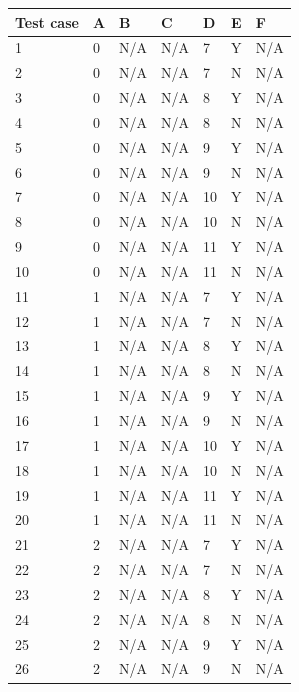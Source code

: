 \documentclass[12pt, letterpaper, titlepage]{article}
\begin{document}
\begin{centering}
\begin{tabularx}{\textwidth}{|X|X|X|X|X|X|X|}
    \caption{Test cases for output X} \\ \hline
    \textbf{Test case} & \textbf{A} & \textbf{B} & \textbf{C} & \textbf{D} & \textbf{E} & \textbf{F} \\ \hline
    1 & 0 & N/A & N/A & 7 & Y & N/A \\ \hline
    2 & 0 & N/A & N/A & 7 & N & N/A \\ \hline
    3 & 0 & N/A & N/A & 8 & Y & N/A \\ \hline
    4 & 0 & N/A & N/A & 8 & N & N/A \\ \hline
    5 & 0 & N/A & N/A & 9 & Y & N/A \\ \hline
    6 & 0 & N/A & N/A & 9 & N & N/A \\ \hline
    7 & 0 & N/A & N/A & 10 & Y & N/A \\ \hline
    8 & 0 & N/A & N/A & 10 & N & N/A \\ \hline
    9 & 0 & N/A & N/A & 11 & Y & N/A \\ \hline
    10 & 0 & N/A & N/A & 11 & N & N/A \\ \hline
    11 & 1 & N/A & N/A & 7 & Y & N/A \\ \hline
    12 & 1 & N/A & N/A & 7 & N & N/A \\ \hline
    13 & 1 & N/A & N/A & 8 & Y & N/A \\ \hline
    14 & 1 & N/A & N/A & 8 & N & N/A \\ \hline
    15 & 1 & N/A & N/A & 9 & Y & N/A \\ \hline
    16 & 1 & N/A & N/A & 9 & N & N/A \\ \hline
    17 & 1 & N/A & N/A & 10 & Y & N/A \\ \hline
    18 & 1 & N/A & N/A & 10 & N & N/A \\ \hline
    19 & 1 & N/A & N/A & 11 & Y & N/A \\ \hline
    20 & 1 & N/A & N/A & 11 & N & N/A \\ \hline
    21 & 2 & N/A & N/A & 7 & Y & N/A \\ \hline
    22 & 2 & N/A & N/A & 7 & N & N/A \\ \hline
    23 & 2 & N/A & N/A & 8 & Y & N/A \\ \hline
    24 & 2 & N/A & N/A & 8 & N & N/A \\ \hline
    25 & 2 & N/A & N/A & 9 & Y & N/A \\ \hline
    26 & 2 & N/A & N/A & 9 & N & N/A \\ \hline

\end{tabularx}
\end{centering}
\end{document}
